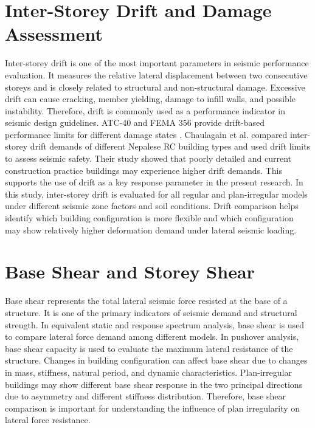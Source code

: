 \section{Inter-Storey Drift and Damage Assessment}
Inter-storey drift is one of the most important parameters in seismic performance evaluation. It measures the relative lateral displacement between two consecutive storeys and is closely related to structural and non-structural damage. Excessive drift can cause cracking, member yielding, damage to infill walls, and possible instability. Therefore, drift is commonly used as a performance indicator in seismic design guidelines.
ATC-40 and FEMA 356 provide drift-based performance limits for different damage states \cite{atc1996atc40,fema2000fema356}. Chaulagain et al. \cite{chaulagain2013seismic} compared inter-storey drift demands of different Nepalese RC building types and used drift limits to assess seismic safety. Their study showed that poorly detailed and current construction practice buildings may experience higher drift demands. This supports the use of drift as a key response parameter in the present research.
In this study, inter-storey drift is evaluated for all regular and plan-irregular models under different seismic zone factors and soil conditions. Drift comparison helps identify which building configuration is more flexible and which configuration may show relatively higher deformation demand under lateral seismic loading.
\section{Base Shear and Storey Shear}
Base shear represents the total lateral seismic force resisted at the base of a structure. It is one of the primary indicators of seismic demand and structural strength. In equivalent static and response spectrum analysis, base shear is used to compare lateral force demand among different models. In pushover analysis, base shear capacity is used to evaluate the maximum lateral resistance of the structure.
Changes in building configuration can affect base shear due to changes in mass, stiffness, natural period, and dynamic characteristics. Plan-irregular buildings may show different base shear response in the two principal directions due to asymmetry and different stiffness distribution. Therefore, base shear comparison is important for understanding the influence of plan irregularity on lateral force resistance.
